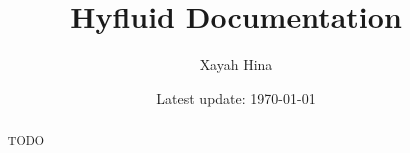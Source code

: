 \documentclass[10pt,twocolumn]{article}
\title{Hyfluid Documentation}
\author{Xayah Hina}
\date{Latest update: \today}
\begin{document}
    \maketitle

    \begin{abstract}
        TODO
    \end{abstract}

    
    

    
    
\end{document}
